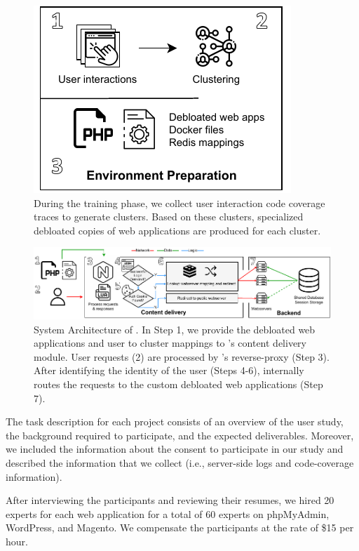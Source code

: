 \begin{figure}[t]
    \centering
    \includegraphics[]{figures/dbltr/EnvironmentPreparation.pdf}
    \caption{During the training phase, we collect user interaction code coverage traces to generate clusters. Based on these clusters, specialized debloated copies of web applications are produced for each cluster.}
    \label{fig:environment_preparation}
\end{figure}

\begin{figure}[h]
    \centering
    \includegraphics[width=0.95\columnwidth]{figures/dbltr/RoleModelsFlow.pdf}
    \caption{System Architecture of \sys{}. In Step 1, we provide the debloated web applications and user to cluster mappings to \sys{}'s content delivery module. User requests (2) are processed by \sys{}'s reverse-proxy (Step 3). After identifying the identity of the user (Steps 4-6), \sys{} internally routes the requests to the custom debloated web applications (Step 7).}
	\label{fig:system_architecture}
\end{figure}

The task description for each project consists of an overview of the user study, the background required to participate, and the expected deliverables. 
Moreover, we included the information about the consent to participate in our study and described the information that we collect (i.e., server-side logs and code-coverage information). 

After interviewing the participants and reviewing their resumes, we hired 20 experts for each web application for a total of 60 experts on phpMyAdmin, WordPress, and Magento. 
We compensate the participants at the rate of \$15 per hour.

